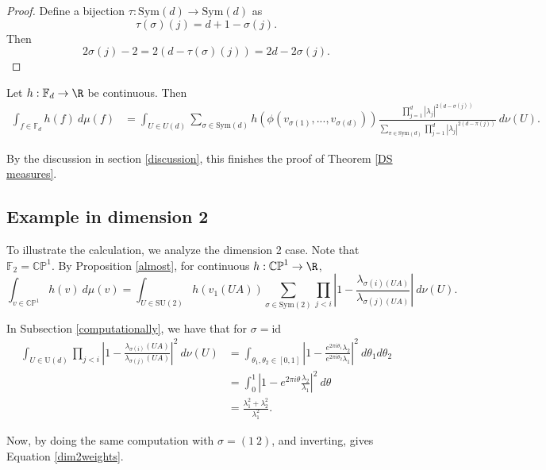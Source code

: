 \documentclass[10pt]{amsart}
\numberwithin{equation}{section}     %
\newcommand{\CP}{\mathbb{CP}}
\newcommand{\Sym}{\mathrm{Sym}}
\newcommand{\FF}{\mathbb{F}}
\newcommand{\SU}{\mathrm{SU}}
\newcommand{\U}{\mathrm{U}}
\begin{document}
\begin{proof}
    Define a bijection $\tau:\Sym(d) \to \Sym(d)$ as $$\tau(\sigma)(j) = d + 1 - \sigma(j).$$ Then $$2\sigma(j) - 2 = 2(d-\tau(\sigma)(j)) = 2d - 2\sigma(j).$$
\end{proof}

\begin{proposition} \label{almostalmost}
        Let $h:\FF_d \to \R$ be continuous. Then
        \begin{align*}
            \int_{f \in \FF_d} h(f) \ d\mu(f)
           &=  \int_{U \in U(d)} \sum_{\sigma \in \Sym(d)} h(\phi(v_{\sigma(1)},...,v_{\sigma(d)})) \frac{\prod \limits_{j=1}^d |\lambda_j|^{2(d-\sigma(j))}}{\sum \limits_{\pi \in \Sym(d)} \prod_{j=1}^d |\lambda_j|^{2(d-\pi(j))}  }\ d\nu(U).
        \end{align*}
\end{proposition}

By the discussion in section \ref{discussion}, this finishes the proof of Theorem \ref{DS measures}. 


\subsection{Example in dimension 2}

To illustrate the calculation, we analyze the dimension 2 case. Note that $\FF_2 = \CP^1$. By Proposition \ref{almost}, for continuous $h: \CP^1 \to \R$, $$\int_{v \in \CP^1} h(v) \ d\mu(v) = \int_{U \in \SU(2)} h(v_1(UA)) \sum \limits_{\sigma \in \Sym(2)} \prod \limits_{j < i} \left| 1 - \frac{\lambda_{\sigma(i)(UA)}}{\lambda_{\sigma(j)(UA)}}\right| \ d\nu(U).$$

In Subsection \ref{computationally}, we have that for $\sigma = \text{id}$ \begin{align*}
    \int_{U \in \U(d)}\prod \limits_{j < i} \left| 1 - \frac{\lambda_{\sigma(i)}(UA)}{\lambda_{\sigma(j)}(UA)} \right|^2 \ d\nu(U) &= \int_{\theta_1,\theta_2 \in [0,1]} \left| 1 -  \frac{ e^{2\pi i\theta_1}\lambda_2}{e^{2 \pi i\theta_2}\lambda_1}\right|^{2} \ d\theta_1 d\theta_2 \\
    &= \int_0^{1} \left| 1 - e^{2 \pi i\theta} \frac{ \lambda_2}{\lambda_1}\right|^{2} \ d\theta \\
    &=\frac{\lambda_1^2 + \lambda_2^2}{\lambda_1^2}.
\end{align*}

Now, by doing the same computation with $\sigma = (1 \ 2)$, and inverting, gives Equation \ref{dim2weights}.
\end{document}
